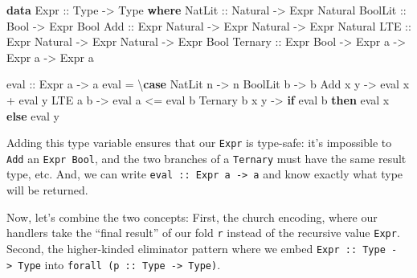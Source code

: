 \documentclass[]{article}
\newenvironment{Shaded}{}{}
\newcommand{\DataTypeTok}[1]{\textcolor[rgb]{0.56,0.13,0.00}{#1}}
\newcommand{\KeywordTok}[1]{\textcolor[rgb]{0.00,0.44,0.13}{\textbf{#1}}}
\newcommand{\NormalTok}[1]{#1}
\newcommand{\OperatorTok}[1]{\textcolor[rgb]{0.40,0.40,0.40}{#1}}
\newcommand{\OtherTok}[1]{\textcolor[rgb]{0.00,0.44,0.13}{#1}}
\begin{document}
\begin{Shaded}
\begin{Highlighting}[]
\KeywordTok{data} \DataTypeTok{Expr}\OtherTok{ ::} \DataTypeTok{Type} \OtherTok{{-}\textgreater{}} \DataTypeTok{Type} \KeywordTok{where}
    \DataTypeTok{NatLit}\OtherTok{ ::} \DataTypeTok{Natural} \OtherTok{{-}\textgreater{}} \DataTypeTok{Expr} \DataTypeTok{Natural}
    \DataTypeTok{BoolLit}\OtherTok{ ::} \DataTypeTok{Bool} \OtherTok{{-}\textgreater{}} \DataTypeTok{Expr} \DataTypeTok{Bool}
    \DataTypeTok{Add}\OtherTok{ ::} \DataTypeTok{Expr} \DataTypeTok{Natural} \OtherTok{{-}\textgreater{}} \DataTypeTok{Expr} \DataTypeTok{Natural} \OtherTok{{-}\textgreater{}} \DataTypeTok{Expr} \DataTypeTok{Natural}
    \DataTypeTok{LTE}\OtherTok{ ::} \DataTypeTok{Expr} \DataTypeTok{Natural} \OtherTok{{-}\textgreater{}} \DataTypeTok{Expr} \DataTypeTok{Natural} \OtherTok{{-}\textgreater{}} \DataTypeTok{Expr} \DataTypeTok{Bool}
    \DataTypeTok{Ternary}\OtherTok{ ::} \DataTypeTok{Expr} \DataTypeTok{Bool} \OtherTok{{-}\textgreater{}} \DataTypeTok{Expr}\NormalTok{ a }\OtherTok{{-}\textgreater{}} \DataTypeTok{Expr}\NormalTok{ a }\OtherTok{{-}\textgreater{}} \DataTypeTok{Expr}\NormalTok{ a}

\OtherTok{eval ::} \DataTypeTok{Expr}\NormalTok{ a }\OtherTok{{-}\textgreater{}}\NormalTok{ a}
\NormalTok{eval }\OtherTok{=}\NormalTok{ \textbackslash{}}\KeywordTok{case}
    \DataTypeTok{NatLit}\NormalTok{ n }\OtherTok{{-}\textgreater{}}\NormalTok{ n}
    \DataTypeTok{BoolLit}\NormalTok{ b }\OtherTok{{-}\textgreater{}}\NormalTok{ b}
    \DataTypeTok{Add}\NormalTok{ x y }\OtherTok{{-}\textgreater{}}\NormalTok{ eval x }\OperatorTok{+}\NormalTok{ eval y}
    \DataTypeTok{LTE}\NormalTok{ a b }\OtherTok{{-}\textgreater{}}\NormalTok{ eval a }\OperatorTok{\textless{}=}\NormalTok{ eval b}
    \DataTypeTok{Ternary}\NormalTok{ b x y }\OtherTok{{-}\textgreater{}} \KeywordTok{if}\NormalTok{ eval b }\KeywordTok{then}\NormalTok{ eval x }\KeywordTok{else}\NormalTok{ eval y}
\end{Highlighting}
\end{Shaded}

Adding this type variable ensures that our \texttt{Expr} is type-safe: it's
impossible to \texttt{Add} an \texttt{Expr\ Bool}, and the two branches of a
\texttt{Ternary} must have the same result type, etc. And, we can write
\texttt{eval\ ::\ Expr\ a\ -\textgreater{}\ a} and know exactly what type will
be returned.

Now, let's combine the two concepts: First, the church encoding, where our
handlers take the ``final result'' of our fold \texttt{r} instead of the
recursive value \texttt{Expr}. Second, the higher-kinded eliminator pattern
where we embed \texttt{Expr\ ::\ Type\ -\textgreater{}\ Type} into
\texttt{forall\ (p\ ::\ Type\ -\textgreater{}\ Type)}.
\end{document}
